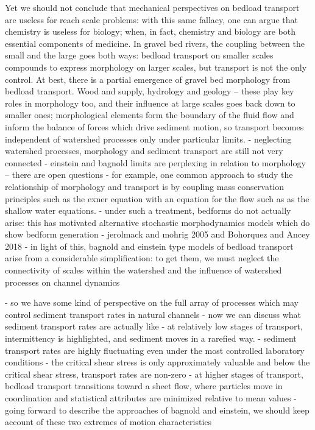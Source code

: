 \documentclass{article}
\begin{document}
Yet we should not conclude that mechanical perspectives on bedload transport are useless for reach scale problems: with this same fallacy, one can argue that chemistry is useless for biology; when, in fact, chemistry and biology are both essential components of medicine. 
In gravel bed rivers, the coupling between the small and the large goes both ways: bedload transport on smaller scales compounds to express morphology on larger scales, but transport is not the only control. 
At best, there is a partial emergence of gravel bed morphology from bedload transport. 
Wood and supply, hydrology and geology -- these play key roles in morphology too, and their influence at large scales goes back down to smaller ones; morphological elements form the boundary of the fluid flow and inform the balance of forces which drive sediment motion, so transport becomes independent of watershed processes only under particular limits. 
- neglecting watershed processes, morphology and sediment transport are still not very connected 
- einstein and bagnold limits are perplexing in relation to morphology -- there are open questions
- for example, one common approach to study the relationship of morphology and transport is by coupling mass conservation principles such as the exner equation with an equation for the flow such as as the shallow water equations. 
- under such a treatment, bedforms do not actually arise: this has motivated alternative stochastic morphodynamics models which do show bedform generation 
- jerolmack and mohrig 2005 and Bohorquez and Ancey 2018
- in light of this, bagnold and einstein type models of bedload transport arise from a considerable simplification: to get them, we must neglect the connectivity of scales within the watershed and the influence of watershed processes on channel dynamics

- so we have some kind of perspective on the full array of processes which may control sediment transport rates in natural channels 
- now we can discuss what sediment transport rates are actually like 
- at relatively low stages of transport, intermittency is highlighted, and sediment moves in a rarefied way. 
- sediment transport rates are highly fluctuating even under the most controlled laboratory conditions
- the critical shear stress is only approximately valuable and below the critical shear stress, transport rates are non-zero 
- at higher stages of transport, bedload transport transitions toward a sheet flow, where particles move in coordination and statistical attributes are minimized relative to mean values
- going forward to describe the approaches of bagnold and einstein, we should keep account of these two extremes of motion characteristics 
\end{document}

